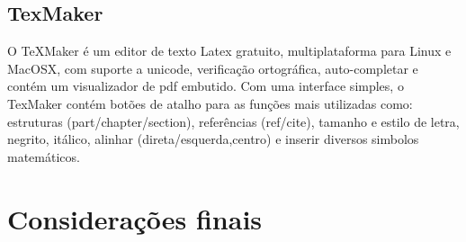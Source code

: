 \subsection{TexMaker}
O TeXMaker é um editor de texto Latex gratuito, multiplataforma para Linux e MacOSX, com suporte a unicode, verificação ortográfica, auto-completar e contém um visualizador de pdf embutido.
Com uma interface simples, o TexMaker contém botões de atalho para as funções mais utilizadas como: estruturas (part/chapter/section), referências (ref/cite), tamanho e estilo de letra, negrito, itálico, alinhar (direta/esquerda,centro) e inserir diversos simbolos matemáticos.

\section{Considerações finais}